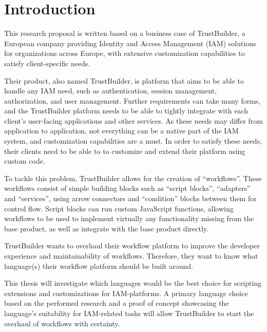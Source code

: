 
\section{Introduction}%
\label{sec:introduction}

This research proposal is written based on a business case of TrustBuilder, a European company providing Identity and Access Management (IAM) solutions for organizations across Europe, with extensive customization capabilities to satisfy client-specific needs.

Their product, also named TrustBuilder, is platform that aims to be able to handle any IAM need, such as authentication, session management, authorization, and user management. Further requirements can take many forms, and the TrustBuilder platform needs to be able to tightly integrate with each client’s user-facing applications and other services. As these needs may differ from application to application, not everything can be a native part of the IAM system, and customization capabilities are a must. In order to satisfy these needs, their clients need to be able to to customize and extend their platform using custom code.

To tackle this problem, TrustBuilder allows for the creation of “workflows”. These workflows consist of simple building blocks such as “script blocks”, “adapters” and “services”, using arrow connectors and “condition” blocks between them for control flow. Script blocks can run custom JavaScript functions, allowing workflows to be used to implement virtually any functionality missing from the base product, as well as integrate with the base product directly.

TrustBuilder wants to overhaul their workflow platform to improve the developer experience and maintainability of workflows. Therefore, they want to know what language(s) their workflow platform should be built around.

This thesis will investigate which languages would be the best choice for scripting extensions and customizations for IAM-platforms. A primary language choice based on the performed research and a proof of concept showcasing the language’s suitability for IAM-related tasks will allow TrustBuilder to start the overhaul of workflows with certainty.


